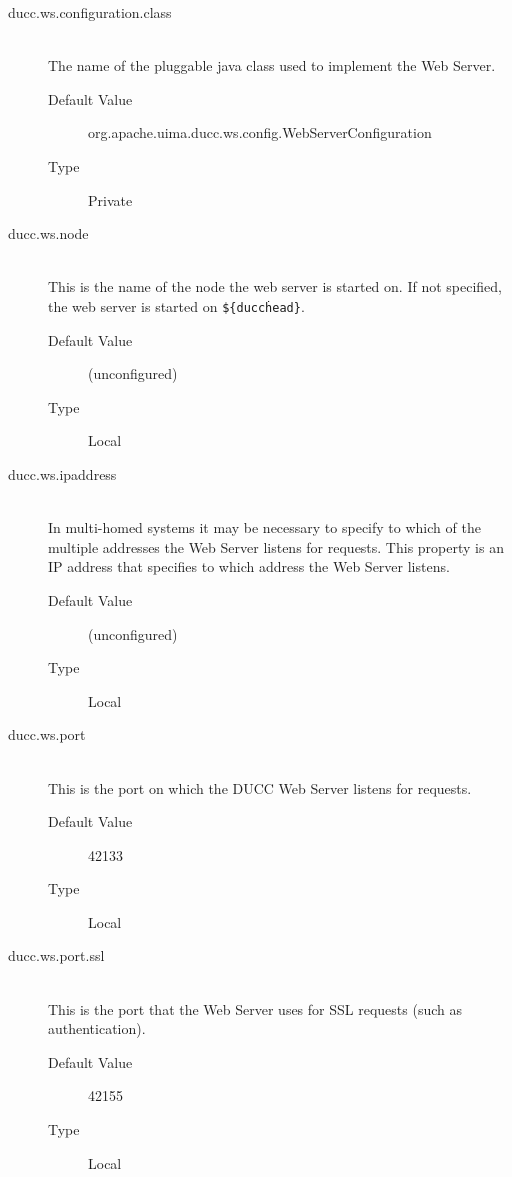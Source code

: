     \begin{description}
        \item[ducc.ws.configuration.class] \hfill \\
          The name of the pluggable java class used to implement the Web Server. 
          \begin{description}
            \item[Default Value] org.apache.uima.ducc.ws.config.WebServerConfiguration 
            \item[Type] Private 
          \end{description}
        
        \item[ducc.ws.node] \hfill \\
          This is the name of the node the web server is started on. If not specified, the web server is 
          started on {\tt \$\{ducc\.head\}}.
          \begin{description}
            \item[Default Value] (unconfigured) 
            \item[Type] Local 
          \end{description}
            

        \item[ducc.ws.ipaddress] \hfill \\
          In multi-homed systems it may be necessary to specify to which of the multiple addresses 
          the Web Server listens for requests. This property is an IP address that specifies to which 
          address the Web Server listens. 
          \begin{description}
            \item[Default Value] (unconfigured) 
            \item[Type] Local 
          \end{description}
              
        \item[ducc.ws.port] \hfill \\
          This is the port on which the DUCC Web Server listens for requests. 
          \begin{description}
            \item[Default Value] 42133 
            \item[Type] Local 
          \end{description}

        \item[ducc.ws.port.ssl] \hfill \\
          This is the port that the Web Server uses for SSL requests (such as authentication). 
          \begin{description}
            \item[Default Value] 42155 
            \item[Type] Local 
          \end{description}


\end{description}

